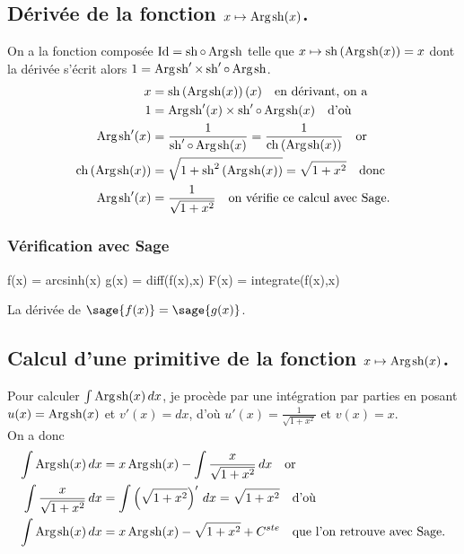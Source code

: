 \documentclass[a4paper,12pt]{report}
\def\Id{\ensuremath{\mathrm{Id}}}
\renewcommand{\sinh}{\mathop{\mathrm{sh}}}
\renewcommand{\cosh}{\mathop{\mathrm{ch}}}
\renewcommand{\arg}{\mathop{\mathrm{Arg}}}
\begin{document}
\subsection{Dérivée de la fonction $x \mapsto \arg\mspace{-1mu}\sinh(x)$.}
On a la fonction composée $\Id = \sinh \circ \arg\mspace{-1mu}\sinh$ telle que $x\mapsto\sinh\left(\arg\mspace{-1mu}\sinh(x)\right)=x$ dont la dérivée s'écrit alors $1= \arg\mspace{-1mu}\sinh\nolimits' \times \sinh\nolimits'\circ\arg\mspace{-1mu}\sinh$.
\begin{align*}
x & =\sinh\left(\arg\mspace{-1mu}\sinh(x)\right)(x) \quad \textrm{en dérivant, on a}\\
1 & = \arg\mspace{-1mu}\sinh\nolimits'(x) \times \sinh\nolimits'\circ\arg\mspace{-1mu}\sinh(x) \quad \textrm{d'où}\\
\arg\mspace{-1mu}\sinh\nolimits'(x) & =\frac{1}{ \sinh\nolimits'\circ\arg\mspace{-1mu}\sinh(x)}=\frac{1}{ \cosh\left(\arg\mspace{-1mu}\sinh(x)\right)}\quad \textrm{or}\\
\cosh\left(\arg\mspace{-1mu}\sinh(x)\right) & = \sqrt{1+\sinh\nolimits^2\left(\arg\mspace{-1mu}\sinh(x)\right)}=\sqrt{1+x^2}\quad \textrm{donc}\\
\arg\mspace{-1mu}\sinh\nolimits'(x) & = \frac{1}{ \sqrt{1+x^2}}\quad \textrm{on vérifie ce calcul avec Sage.}
\end{align*}


\subsubsection{Vérification avec Sage}


\begin{sageblock}
    f(x) = arcsinh(x)
    g(x) = diff(f(x),x)
    F(x) = integrate(f(x),x)
\end{sageblock}

La dérivée de $\sage{f(x)} = \sage{g(x)} $.


\subsection{Calcul d'une primitive de la fonction  $x \mapsto \arg\mspace{-1mu}\sinh(x)$.}

Pour calculer $\int \arg\mspace{-1mu}\sinh(x) \, dx$, je procède par une intégration par parties en posant $u(x) = \arg\mspace{-1mu}\sinh(x)$ et $v'(x) = dx$, d'où $u'(x) = \frac{1}{ \sqrt{1+x^2}}$ et $ v(x) = x $. \\
On a donc
\begin{align*}
\int \arg\mspace{-1mu}\sinh(x) \, dx & = x \arg\mspace{-1mu}\sinh(x) - \int \frac{x}{ \sqrt{1+x^2}} \, dx \quad \textrm{or}\\
\int \frac{x}{ \sqrt{1+x^2}} \, dx & = \int \left(\sqrt{1+x^2}\right)' \, dx = \sqrt{1+x^2}  \quad \textrm{d'où}\\
\int \arg\mspace{-1mu}\sinh(x) \, dx & = x \arg\mspace{-1mu}\sinh(x) - \sqrt{1+x^2} + C^{ste} \quad \textrm{que l'on retrouve avec Sage.}
\end{align*}
\end{document}
